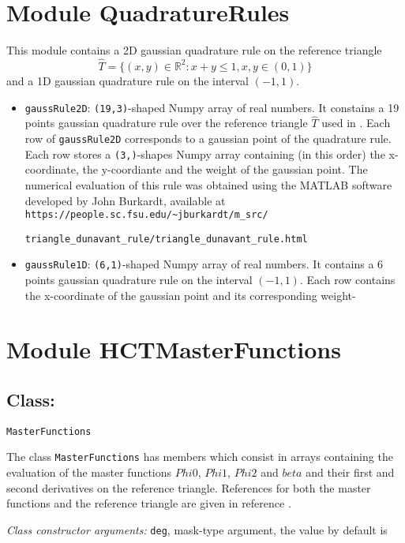 \documentclass{amsart}
\theoremstyle{plain}
\theoremstyle{definition}
\theoremstyle{remark}
\numberwithin{equation}{section}
\newcommand{\R}{\mathbb R}
\begin{document}
\section{Module QuadratureRules}

This module contains a 2D gaussian quadrature rule on the reference triangle $$\hat{T}=\{(x,y)\in \R^2: x+y\leq 1, x,y\in(0,1)\}$$ and a 1D gaussian quadrature rule on the interval $(-1,1)$.
\begin{itemize}
\item \verb|gaussRule2D|: \verb|(19,3)|-shaped Numpy array of real numbers. It constains a 19 points gaussian quadrature rule over the reference triangle $\hat{T}$ used in \cite{Meyer}. Each row of \verb|gaussRule2D| corresponds to a gaussian point of the quadrature rule. Each row stores a \verb|(3,)|-shapes Numpy array containing (in this order) the x-coordinate, the y-coordiante and the weight of the gaussian point. The numerical evaluation of this rule was obtained using the MATLAB software developed by  John Burkardt,  available at  \verb|https://people.sc.fsu.edu/~jburkardt/m_src/|

\verb|triangle_dunavant_rule/triangle_dunavant_rule.html|
\item \verb|gaussRule1D|: \verb|(6,1)|-shaped Numpy array of real numbers. It contains a 6 points gaussian quadrature rule on the interval $(-1,1)$. Each row contains the x-coordinate of the gaussian point and its corresponding weight-
\end{itemize}

\section{Module HCTMasterFunctions}

\subsection{Class:} \verb|MasterFunctions|

The class \verb|MasterFunctions| has members which consist in arrays containing the evaluation of the master functions $Phi0$, $Phi1$, $Phi2$ and $beta$ and their first and second derivatives on the reference triangle. References for both the master functions and the reference triangle are given in reference \cite{Meyer}.

\textit{Class constructor arguments:} \verb|deg|, mask-type argument, the value by default is 
\end{document}
